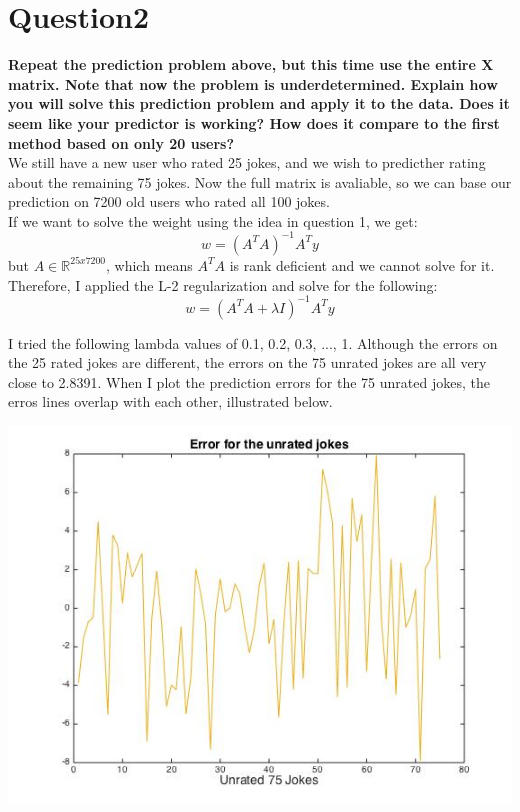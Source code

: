 \documentclass[paper=a4, fontsize=11pt]{scrartcl} %
\numberwithin{equation}{section} %
\numberwithin{figure}{section} %
\numberwithin{table}{section} %
\begin{document}
\section*{Question2}
\textbf{Repeat the prediction problem above, but this time use the entire X matrix. Note that now the problem is underdetermined. Explain how you will solve this prediction problem and apply it to the data. Does it seem like your predictor is working? How does it compare to the first method based on only 20 users?}\\ 


We still have a new user who rated 25 jokes, and we wish to predicther rating about the remaining 75 jokes.  Now the full matrix is avaliable, so we can base our prediction on 7200 old users who rated all 100 jokes. \\

If we want to solve the weight using the idea in question 1, we get: 
$$ w = (A^T A)^{-1} A^T y $$
but $ A \in \mathbb{R}^{25x7200}$, which means $A^TA$ is rank deficient and we cannot solve for it. Therefore, I applied the L-2 regularization and solve for the following: 
$$ w = (A^T A + \lambda I)^{-1} A^T y $$

I tried the following lambda values of 0.1, 0.2, 0.3, ..., 1. Although the errors on the 25 rated jokes are different, the errors on the 75 unrated jokes are all very close to 2.8391. When I plot the prediction errors for the 75 unrated jokes, the erros lines overlap with each other, illustrated below. 

\begin{center}
\includegraphics[scale=.6]{2_error.jpg}
\end{center}
\end{document}
